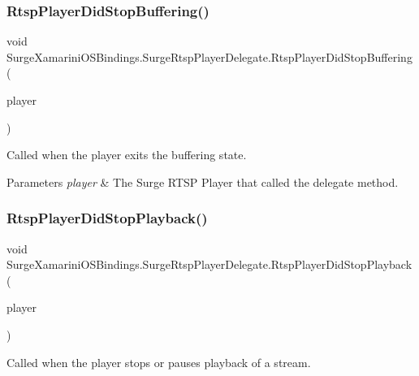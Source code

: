 \subsubsection{\texorpdfstring{Rtsp\+Player\+Did\+Stop\+Buffering()}{RtspPlayerDidStopBuffering()}}
{\footnotesize\ttfamily void Surge\+Xamarini\+O\+S\+Bindings.\+Surge\+Rtsp\+Player\+Delegate.\+Rtsp\+Player\+Did\+Stop\+Buffering (\begin{DoxyParamCaption}\item[{\hyperlink{interface_surge_xamarini_o_s_bindings_1_1_surge_rtsp_player}{Surge\+Rtsp\+Player}}]{player }\end{DoxyParamCaption})}



Called when the player exits the buffering state. 


\begin{DoxyParams}{Parameters}
{\em player} & The Surge R\+T\+SP Player that called the delegate method.\\
\hline
\end{DoxyParams}
\mbox{\label{interface_surge_xamarini_o_s_bindings_1_1_surge_rtsp_player_delegate_acbda4e7146444810d2800ad8e6a90d88}} 
\subsubsection{\texorpdfstring{Rtsp\+Player\+Did\+Stop\+Playback()}{RtspPlayerDidStopPlayback()}}
{\footnotesize\ttfamily void Surge\+Xamarini\+O\+S\+Bindings.\+Surge\+Rtsp\+Player\+Delegate.\+Rtsp\+Player\+Did\+Stop\+Playback (\begin{DoxyParamCaption}\item[{\hyperlink{interface_surge_xamarini_o_s_bindings_1_1_surge_rtsp_player}{Surge\+Rtsp\+Player}}]{player }\end{DoxyParamCaption})}



Called when the player stops or pauses playback of a stream. 


